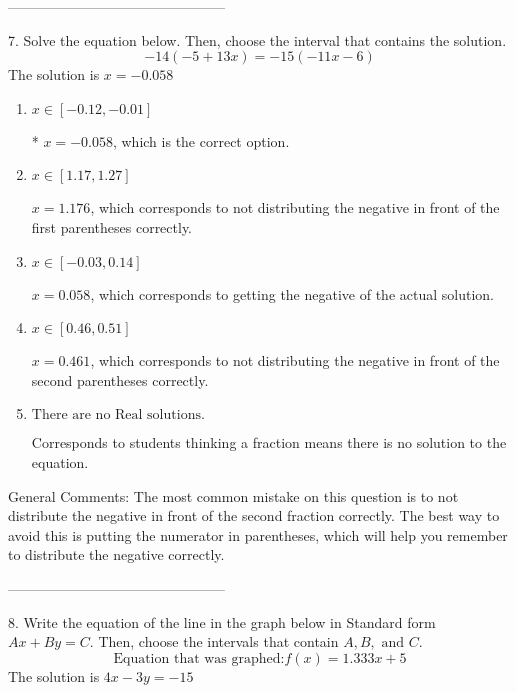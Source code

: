 \documentclass{article}[14pt]
\begin{document}
-----------------------------------------------

7. Solve the equation below. Then, choose the interval that contains the solution.
$$ -14(-5+13 x) = -15(-11 x-6) $$ 
The solution is $ x = -0.058 $ 

\begin{enumerate}[label=\Alph*.] 
\item $ x \in [-0.12, -0.01] $ 

 * $x = -0.058$, which is the correct option. 
\item $ x \in [1.17, 1.27] $ 

  $x = 1.176$, which corresponds to not distributing the negative in front of the first parentheses correctly. 
\item $ x \in [-0.03, 0.14] $ 

  $x = 0.058$, which corresponds to getting the negative of the actual solution. 
\item $ x \in [0.46, 0.51] $ 

  $x = 0.461$, which corresponds to not distributing the negative in front of the second parentheses correctly. 
\item $ \text{There are no Real solutions. } $ 

 Corresponds to students thinking a fraction means there is no solution to the equation. 
\end{enumerate} 
 
General Comments: The most common mistake on this question is to not distribute the negative in front of the second fraction correctly. The best way to avoid this is putting the numerator in parentheses, which will help you remember to distribute the negative correctly.

-----------------------------------------------

8. Write the equation of the line in the graph below in Standard form $Ax+By=C$. Then, choose the intervals that contain $A, B, \text{ and } C$.
$$ \text{Equation that was graphed:} f(x)= 1.333 x + 5 $$ 
The solution is $ 4 x - 3 y = -15 $ 
\end{document}
